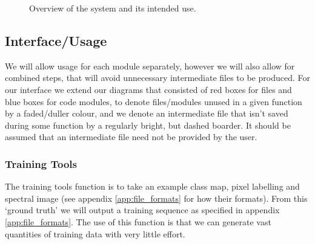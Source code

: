 \documentclass[12pt,twoside,notitlepage]{report}
\begin{document}
\begin{figure}[H]
{\begin{tikzpicture}[node distance=2cm,>=stealth',bend angle=45,auto]
                                
                        \end{tikzpicture}
                    }

                \caption{Overview of the system and its intended use.}
                \label{fig:system_overview}
            \end{figure}   



        \subsection{Interface/Usage}
            We will allow usage for each module separately, however we will also allow for combined steps, that will 
            avoid unnecessary intermediate files to be produced. For our interface we extend our diagrams that consisted 
            of red boxes for files and blue boxes for code modules, to denote files/modules unused in a given function 
            by a faded/duller colour, and we denote an intermediate file that isn't saved during some function by a 
            regularly bright, but dashed boarder. It should be assumed that an intermediate file need not be provided 
            by the user.




            \subsubsection{Training Tools}
                The training tools function is to take an example class map, pixel labelling and spectral image (see 
                appendix \ref{app:file_formats} for how their formats). From this `ground truth' we will output a 
                training sequence as specified in appendix \ref{app:file_formats}. The use of this function is that we 
                can generate vast quantities of training data with very little effort.
\end{document}
